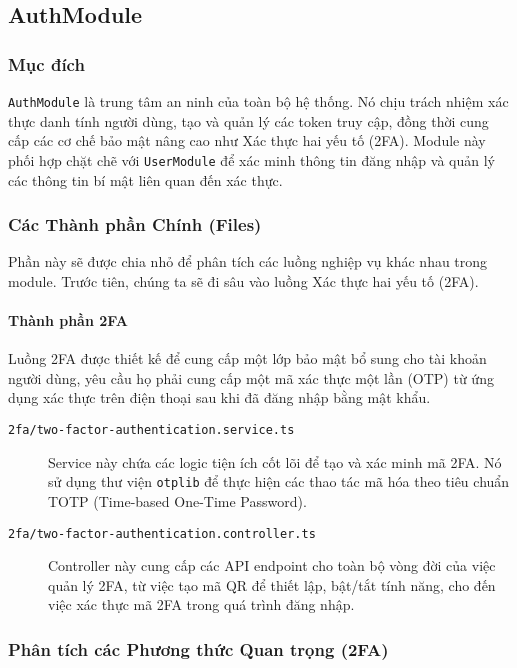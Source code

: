 \subsection{AuthModule}
\label{subsec:auth-module}

\subsubsection{Mục đích}
\texttt{AuthModule} là trung tâm an ninh của toàn bộ hệ thống. Nó chịu trách nhiệm xác thực danh tính người dùng, tạo và quản lý các token truy cập, đồng thời cung cấp các cơ chế bảo mật nâng cao như Xác thực hai yếu tố (2FA). Module này phối hợp chặt chẽ với \texttt{UserModule} để xác minh thông tin đăng nhập và quản lý các thông tin bí mật liên quan đến xác thực.

\subsubsection{Các Thành phần Chính (Files)}
Phần này sẽ được chia nhỏ để phân tích các luồng nghiệp vụ khác nhau trong module. Trước tiên, chúng ta sẽ đi sâu vào luồng Xác thực hai yếu tố (2FA).


\paragraph{Thành phần 2FA}
Luồng 2FA được thiết kế để cung cấp một lớp bảo mật bổ sung cho tài khoản người dùng, yêu cầu họ phải cung cấp một mã xác thực một lần (OTP) từ ứng dụng xác thực trên điện thoại sau khi đã đăng nhập bằng mật khẩu.

\begin{description}
    \item[\texttt{2fa/two-factor-authentication.service.ts}] Service này chứa các logic tiện ích cốt lõi để tạo và xác minh mã 2FA. Nó sử dụng thư viện \texttt{otplib} để thực hiện các thao tác mã hóa theo tiêu chuẩn TOTP (Time-based One-Time Password).
    
    \item[\texttt{2fa/two-factor-authentication.controller.ts}] Controller này cung cấp các API endpoint cho toàn bộ vòng đời của việc quản lý 2FA, từ việc tạo mã QR để thiết lập, bật/tắt tính năng, cho đến việc xác thực mã 2FA trong quá trình đăng nhập.
\end{description}

\subsubsection{Phân tích các Phương thức Quan trọng (2FA)}

